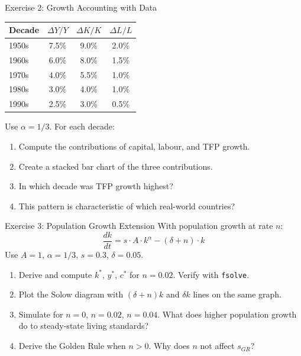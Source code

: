 \documentclass[aspectratio=169, 10pt]{beamer}
\begin{document}
\begin{frame}{Exercise 2: Growth Accounting with Data}
\begin{center}
\begin{tabular}{lccc}
\toprule
Decade & $\Delta Y/Y$ & $\Delta K/K$ & $\Delta L/L$ \\
\midrule
1950s & 7.5\% & 9.0\% & 2.0\% \\
1960s & 6.0\% & 8.0\% & 1.5\% \\
1970s & 4.0\% & 5.5\% & 1.0\% \\
1980s & 3.0\% & 4.0\% & 1.0\% \\
1990s & 2.5\% & 3.0\% & 0.5\% \\
\bottomrule
\end{tabular}
\end{center}
\vspace{0.3em}
Use $\alpha = 1/3$. For each decade:
\begin{enumerate}
  \item Compute the contributions of capital, labour, and TFP growth.
  \item Create a stacked bar chart of the three contributions.
  \item In which decade was TFP growth highest?
  \item This pattern is characteristic of which real-world countries?
\end{enumerate}
\end{frame}

\begin{frame}{Exercise 3: Population Growth Extension}
With population growth at rate $n$:
\[
  \frac{dk}{dt} = s \cdot A \cdot k^{\alpha} - (\delta + n) \cdot k
\]
\vspace{0.3em}
Use $A = 1$, $\alpha = 1/3$, $s = 0.3$, $\delta = 0.05$.
\begin{enumerate}
  \item Derive and compute $k^*$, $y^*$, $c^*$ for $n = 0.02$.
        Verify with \texttt{fsolve}.
  \item Plot the Solow diagram with $(\delta + n)k$ and $\delta k$
        lines on the same graph.
  \item Simulate for $n = 0$, $n = 0.02$, $n = 0.04$.
        What does higher population growth do to steady-state
        living standards?
  \item Derive the Golden Rule when $n > 0$.
        Why does $n$ not affect $s_{GR}$?
\end{enumerate}
\end{frame}
\end{document}
